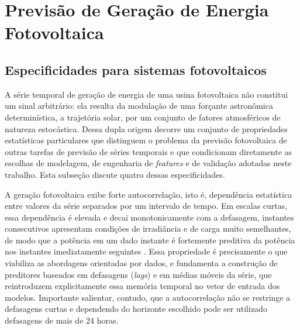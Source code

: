 
\section{Previsão de Geração de Energia Fotovoltaica}
\label{sec:previsao_fv}

\subsection{Especificidades para sistemas fotovoltaicos}
\label{subsec:especificidades_fv}



A série temporal de geração de energia de uma usina fotovoltaica não constitui um sinal
arbitrário: ela resulta da modulação de uma forçante astronômica determinística, a
trajetória solar, por um conjunto de fatores atmosféricos de natureza estocástica. Dessa
dupla origem decorre um conjunto de propriedades estatísticas particulares que distinguem o
problema da previsão fotovoltaica de outras tarefas de previsão de séries temporais e que
condicionam diretamente as escolhas de modelagem, de engenharia de \emph{features} e de
validação adotadas neste trabalho. Esta subseção discute quatro dessas especificidades.

A geração fotovoltaica exibe forte autocorrelação, isto é, dependência estatística entre
valores da série separados por um intervalo de tempo. Em escalas curtas, essa dependência
é elevada e decai monotonicamente com a defasagem, instantes consecutivos apresentam
condições de irradiância e de carga muito semelhantes, de modo que a potência em um dado
instante é fortemente preditiva da potência nos instantes imediatamente seguintes
\cite{Zhou2022}. Essa propriedade é precisamente o que viabiliza as abordagens orientadas
por dados, e fundamenta a construção de preditores baseados em defasagens (\emph{lags}) e em médias móveis da série, que reintroduzem explicitamente essa memória temporal no vetor de entrada dos modelos. Importante salientar, contudo, que a autocorrelação não se restringe a defasagens curtas e dependendo do horizonte escolhido pode ser utilizado defasagens de mais de 24 horas.

